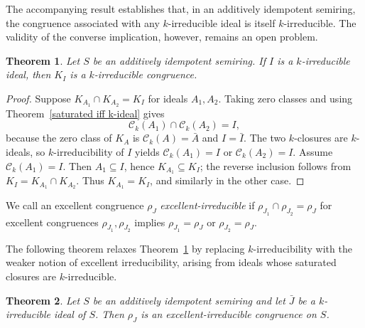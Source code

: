 \documentclass[11pt,leqno]{amsart}
\newtheorem{theorem}{Theorem}[section]
\newtheorem{proposition}[theorem]{Proposition}
\theoremstyle{definition}
\numberwithin{equation}{section}
\begin{document}
 The accompanying result establishes that, in an additively idempotent semiring, the congruence associated with any $k$-irreducible ideal is itself $k$-irreducible. The validity of the converse implication, however, remains an open problem.
 \begin{theorem}\label{k-irreducible ideal to k-irreducible congruence}
    Let $S$ be an additively idempotent semiring. If $I$ is a $k$-irreducible ideal, then $K_I$ is a $k$-irreducible congruence.
\end{theorem}

\begin{proof}
Suppose $K_{A_1}\cap K_{A_2}=K_I$ for ideals $A_1,A_2$. Taking zero classes and using Theorem~\ref{saturated iff k-ideal} gives
\[
\mathcal C_k(A_1)\cap\mathcal C_k(A_2)=I,
\]
because the zero class of $K_A$ is $\mathcal C_k(A)=\bar A$ and $I=\bar I$. The two $k$-closures are $k$-ideals, so $k$-irreducibility of $I$ yields $\mathcal C_k(A_1)=I$ or $\mathcal C_k(A_2)=I$. Assume $\mathcal C_k(A_1)=I$. Then $A_1\subseteq I$, hence $K_{A_1}\subseteq K_I$; the reverse inclusion follows from $K_I=K_{A_1}\cap K_{A_2}$. Thus $K_{A_1}=K_I$, and similarly in the other case.
\end{proof}
 
 

We call an excellent congruence $\rho_J$ \emph{excellent-irreducible} if $\rho_{J_1}\cap\rho_{J_2}=\rho_J$ for excellent congruences $\rho_{J_1},\rho_{J_2}$ implies $\rho_{J_1}=\rho_J$ or $\rho_{J_2}=\rho_J$.

 The following theorem relaxes Theorem~\ref{k-irreducible ideal to k-irreducible congruence} by replacing $k$-irreducibility with the weaker notion of excellent irreducibility, arising from ideals whose saturated closures are $k$-irreducible.
 \begin{theorem}
    Let $S$ be an additively idempotent semiring and let $\bar{J}$ be a $k$-irreducible ideal of $S$. Then $\rho_J$ is an excellent-irreducible congruence on $S$.
 \end{theorem}
 
\end{document}

